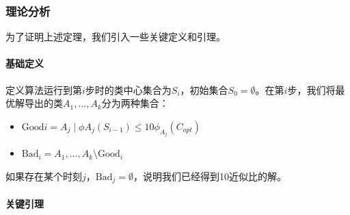 \documentclass[lang=cn,newtx,10pt,scheme=chinese,chinesefont=nofont,citestyle=gb7714-2015, bibstyle=gb7714-2015]{elegantbook}
\begin{document}
\begin{refsection}
\subsubsection{理论分析}
为了证明上述定理，我们引入一些关键定义和引理。
\paragraph*{基础定义}

定义算法运行到第$i$步时的类中心集合为$S_i$，初始集合$S_0 = \emptyset$。在第$i$步，我们将最优解导出的类${A_1,\ldots,A_k}$分为两种集合：

\begin{itemize}
\item $\text{Good}i = {A_j \mid \phi{A_j}(S_{i-1}) \leq 10\phi_{A_j}(C_{opt})}$
\item $\text{Bad}_i = {A_1,\ldots,A_k} \setminus \text{Good}_i$
\end{itemize}

如果存在某个时刻$j$，$\text{Bad}_j = \emptyset$，说明我们已经得到10近似比的解。
\paragraph*{关键引理}


\end{refsection}
\end{document}

